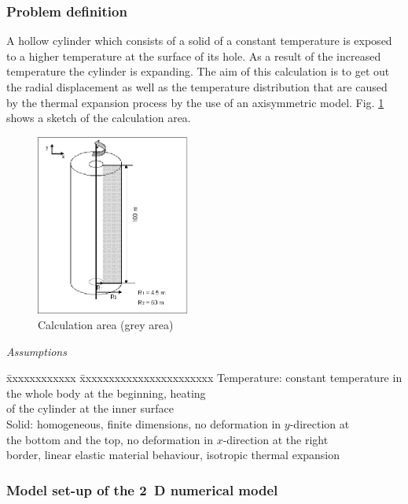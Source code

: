 
\subsubsection{Problem definition}

A hollow cylinder which consists of a solid of a constant temperature is exposed to a higher temperature at the surface of its hole. As a result of the increased temperature the cylinder is expanding. The aim of this calculation is to get out the radial displacement as well as the temperature distribution that are caused by the thermal expansion process by the use of an axisymmetric model. Fig. \ref{fig68} shows a sketch of the calculation area.

\begin{figure}[htbp]
\centering
\includegraphics[width=0.45\textwidth]{TM/figures/fig68.eps}
\caption{Calculation area (grey area)}
\label{fig68}
\end{figure}


\textsl{Assumptions}

\begin{tabbing}
\=xxxxxxxxxxxx  \=xxxxxxxxxxxxxxxxxxxxxxx \kill
\> Temperature: \> constant temperature in the whole body at the beginning, heating \\
\> \> of the cylinder at the inner surface \\[1.0ex]
\> Solid: \> homogeneous, finite dimensions, no deformation in $y$-direction at \\
\> \> the bottom and the top, no deformation in $x$-direction at the right \\
\> \> border, linear elastic material behaviour, isotropic thermal expansion
\end{tabbing}

\subsubsection{Model set-up of the 2~D numerical model}

